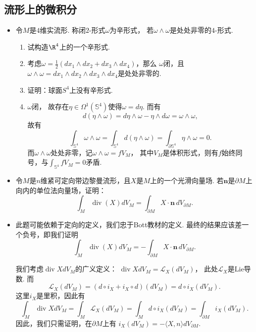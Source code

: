 \subsection{流形上的微积分}
\begin{itemize}
    \item[2.8] 令$M$是$4$维实流形. 称闭$2$-形式$\omega$为辛形式，
               若$\omega \wedge \omega$是处处非零的$4$-形式.
    \begin{enumerate}
        \item[(1)] 试构造$\R^{4}$上的一个辛形式.
        \item[\textbf{解：}] 考虑$\omega = \frac{1}{2}(dx_{1} \wedge dx_{2} + dx_{3} \wedge dx_{4})$，那么
        $\omega$闭，且$\omega \wedge \omega = dx_{1} \wedge dx_{2} \wedge dx_{3} \wedge dx_{4}$是处处非零的.

        \item[(2)] 证明：球面$S^{4}$上没有辛形式.
        \item[\textbf{证明：}] \qquad $\omega$闭，
        故存在$\eta\in \Omega^1(\mathbb{S}^4)$使得$\omega=d\eta$. 而有
                $$d(\eta\wedge \omega)=d\eta\wedge \omega-\eta\wedge d\omega=\omega\wedge \omega,$$
            故有
                $$\int_{\mathbb{S}^4}\omega\wedge \omega
                =\int_{\mathbb{S}^4}d(\eta\wedge \omega)
                =\int_{\partial \mathbb{S}^4}\eta \wedge \omega=0.$$
            而$\omega\wedge \omega$处处非零，记$\omega\wedge \omega=fV_M$，
            其中$V_M$是体积形式，则有$f$始终同号，与$\int_{\mathbb{S}^4}fV_M=0$矛盾.    
    \end{enumerate}

   

    \item[2.10] 令$M$是$n$维紧可定向带边黎曼流形，且$X$是$M$上的一个光滑向量场.
                若$\mathbf{n}$是$\partial M$上向内的单位法向量场，证明：
                \[\int_{M}\operatorname{div}(X)dV_{M} 
                = \int_{\partial M}X \cdot \mathbf{n}\,dV_{\partial M}.\]
    \item[\textbf{证明：}]
        \qquad 此题可能依赖于定向的定义，我们忠于Bott教材的定义. 
        最终的结果应该差一个负号，即我们证明
        \[\int_{M}\operatorname{div}(X)dV_{M} 
        = -\int_{\partial M}X \cdot \mathbf{n}\,dV_{\partial M}.\]

        \qquad 我们考虑$\operatorname{div} X dV_M$的广义定义：
        $\operatorname{div} XdV_M=\mathscr{L}_X(dV_M)$，
        此处$\mathscr{L}_X$是Lie导数. 而
        $$\mathscr{L}_X(dV_M)=(d\circ i_X+i_X\circ d)(dV_M)=d\circ i_X(dV_M).$$
        这里$i_X$是里积，因此有
        $$\int_M \operatorname{div}XdV_M=\int_M \mathscr{L}_X(dV_M)
        =\int_M d\circ i_X(dV_M)=\int_{\partial M}i_X(dV_M).$$
        因此，我们只需证明，在$\partial M$上有
        $i_X(dV_M)=-\langle X, n\rangle dV_{\partial M}$.


\end{itemize}
